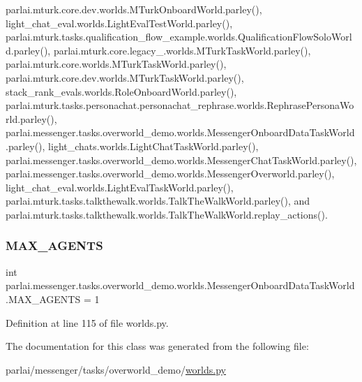 parlai.\+mturk.\+core.\+dev.\+worlds.\+M\+Turk\+Onboard\+World.\+parley(), light\+\_\+chat\+\_\+eval.\+worlds.\+Light\+Eval\+Test\+World.\+parley(), parlai.\+mturk.\+tasks.\+qualification\+\_\+flow\+\_\+example.\+worlds.\+Qualification\+Flow\+Solo\+World.\+parley(), parlai.\+mturk.\+core.\+legacy\+\_.\+worlds.\+M\+Turk\+Task\+World.\+parley(), parlai.\+mturk.\+core.\+worlds.\+M\+Turk\+Task\+World.\+parley(), parlai.\+mturk.\+core.\+dev.\+worlds.\+M\+Turk\+Task\+World.\+parley(), stack\+\_\+rank\+\_\+evals.\+worlds.\+Role\+Onboard\+World.\+parley(), parlai.\+mturk.\+tasks.\+personachat.\+personachat\+\_\+rephrase.\+worlds.\+Rephrase\+Persona\+World.\+parley(), parlai.\+messenger.\+tasks.\+overworld\+\_\+demo.\+worlds.\+Messenger\+Onboard\+Data\+Task\+World.\+parley(), light\+\_\+chats.\+worlds.\+Light\+Chat\+Task\+World.\+parley(), parlai.\+messenger.\+tasks.\+overworld\+\_\+demo.\+worlds.\+Messenger\+Chat\+Task\+World.\+parley(), parlai.\+messenger.\+tasks.\+overworld\+\_\+demo.\+worlds.\+Messenger\+Overworld.\+parley(), light\+\_\+chat\+\_\+eval.\+worlds.\+Light\+Eval\+Task\+World.\+parley(), parlai.\+mturk.\+tasks.\+talkthewalk.\+worlds.\+Talk\+The\+Walk\+World.\+parley(), and parlai.\+mturk.\+tasks.\+talkthewalk.\+worlds.\+Talk\+The\+Walk\+World.\+replay\+\_\+actions().

\mbox{\label{classparlai_1_1messenger_1_1tasks_1_1overworld__demo_1_1worlds_1_1MessengerOnboardDataTaskWorld_a672adcce258c5fe57fa2808193522ae8}} 
\subsubsection{\texorpdfstring{M\+A\+X\+\_\+\+A\+G\+E\+N\+TS}{MAX\_AGENTS}}
{\footnotesize\ttfamily int parlai.\+messenger.\+tasks.\+overworld\+\_\+demo.\+worlds.\+Messenger\+Onboard\+Data\+Task\+World.\+M\+A\+X\+\_\+\+A\+G\+E\+N\+TS = 1\hspace{0.3cm}{\ttfamily [static]}}



Definition at line 115 of file worlds.\+py.



The documentation for this class was generated from the following file\+:\begin{DoxyCompactItemize}
\item 
parlai/messenger/tasks/overworld\+\_\+demo/\hyperlink{parlai_2messenger_2tasks_2overworld__demo_2worlds_8py}{worlds.\+py}\end{DoxyCompactItemize}
